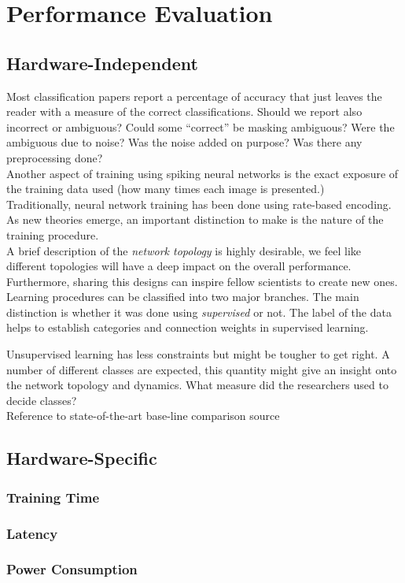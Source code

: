 \section{Performance Evaluation}
\label{sec:eval}
\subsection{Hardware-Independent}
Most classification papers report a percentage of accuracy that just leaves the reader with a measure of the correct classifications. Should we report also incorrect or ambiguous? Could some ``correct'' be masking ambiguous? Were the ambiguous due to noise? Was the noise added on purpose? Was there any preprocessing done?\\

Another aspect of training using spiking neural networks is the exact exposure of the training data used (how many times each image is presented.)\\

Traditionally, neural network training has been done using rate-based encoding. As new theories emerge, an important distinction to make is the nature of the  training procedure.\\

A brief description of the \emph{network topology} is highly desirable, we feel like different topologies will have a deep impact on the overall performance. Furthermore, sharing this designs can inspire fellow scientists to create new ones. \\

Learning procedures can be classified into two major branches. The main distinction is whether it was done using \emph{supervised} or not. The label of the data helps to establish categories and connection weights in supervised learning. 

Unsupervised learning has less constraints but might be tougher to get right. A number of different classes are expected, this quantity might give an insight onto the network topology and dynamics. What measure did the researchers used to decide classes?\\

Reference to state-of-the-art base-line comparison source

\subsection{Hardware-Specific}
	\subsubsection{Training Time}
	\subsubsection{Latency}
	\subsubsection{Power Consumption}
	
